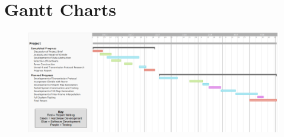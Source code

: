 \chapter{Gantt Charts}
\begin{landscape}
\begin{figure}[ht]
    \begin{center}
    \includegraphics[width=1.5\textwidth]{Figures/ganttfinal.png}
    \label{fig:GanttChart}
    \end{center}
\end{figure}
\end{landscape}